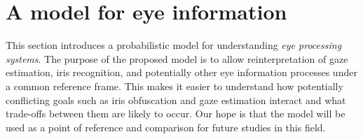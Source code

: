 





\section{A model for eye information}
This section introduces a probabilistic model for understanding \emph{eye processing systems}. The purpose of the proposed model is to allow reinterpretation of gaze estimation, iris recognition, and potentially other eye information processes under a common reference frame. This makes it easier to understand how potentially conflicting goals such as iris obfuscation and gaze estimation interact and what trade-offs between them are likely to occur. Our hope is that the model will be used as a point of reference and comparison for future studies in this field.

